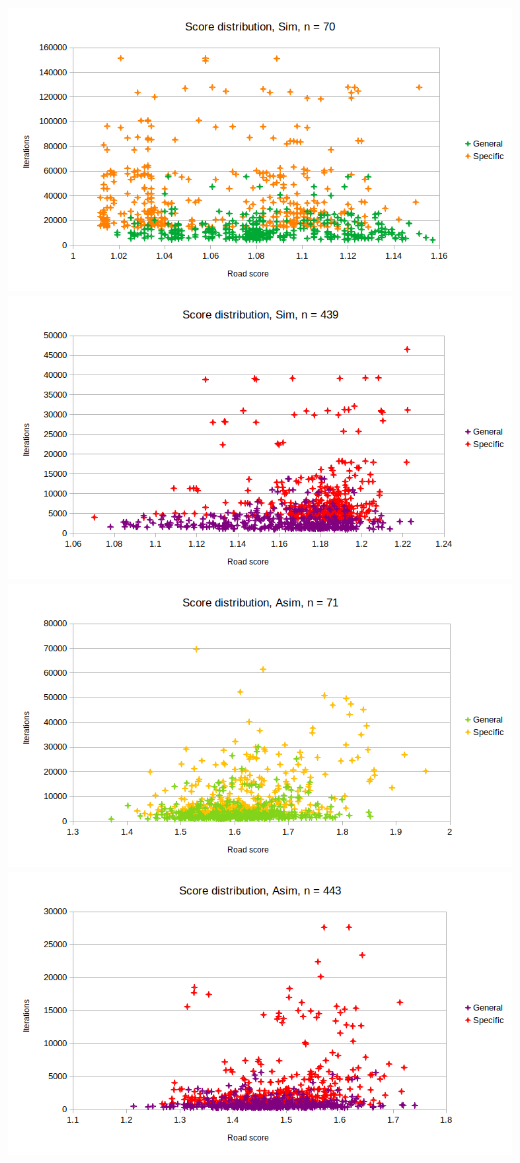 \documentclass{article}
\begin{document}
\includegraphics[scale=0.36]{parDistSim70}
\includegraphics[scale=0.36]{parDistSim439}
\includegraphics[scale=0.36]{parDistAsim71}
\includegraphics[scale=0.36]{parDistAsim443}
\end{document}
